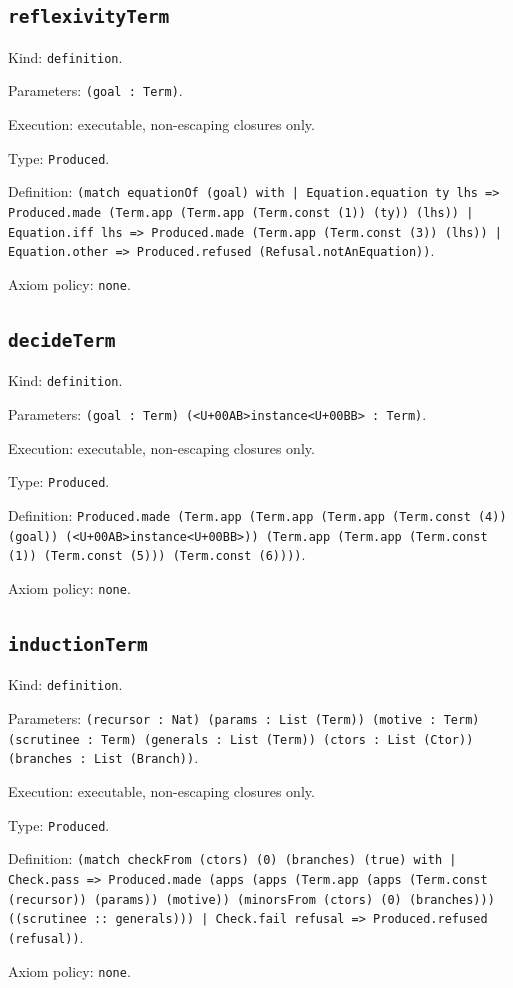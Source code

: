 \documentclass[11pt]{article}
\begin{document}
\subsection*{\texttt{reflexivityTerm}}
\noindent Kind: \texttt{definition}.\par
\noindent Parameters: \texttt{(goal : Term)}.\par
\noindent Execution: executable, non-escaping closures only.\par
\noindent Type: \texttt{Produced}.\par
\noindent Definition: \texttt{(match equationOf (goal) with | Equation.equation ty lhs => Produced.made (Term.app (Term.app (Term.const (1)) (ty)) (lhs)) | Equation.iff lhs => Produced.made (Term.app (Term.const (3)) (lhs)) | Equation.other => Produced.refused (Refusal.notAnEquation))}.\par
\noindent Axiom policy: \texttt{none}.\par
\subsection*{\texttt{decideTerm}}
\noindent Kind: \texttt{definition}.\par
\noindent Parameters: \texttt{(goal : Term) (<U+00AB>instance<U+00BB> : Term)}.\par
\noindent Execution: executable, non-escaping closures only.\par
\noindent Type: \texttt{Produced}.\par
\noindent Definition: \texttt{Produced.made (Term.app (Term.app (Term.app (Term.const (4)) (goal)) (<U+00AB>instance<U+00BB>)) (Term.app (Term.app (Term.const (1)) (Term.const (5))) (Term.const (6))))}.\par
\noindent Axiom policy: \texttt{none}.\par
\subsection*{\texttt{inductionTerm}}
\noindent Kind: \texttt{definition}.\par
\noindent Parameters: \texttt{(recursor : Nat) (params : List (Term)) (motive : Term) (scrutinee : Term) (generals : List (Term)) (ctors : List (Ctor)) (branches : List (Branch))}.\par
\noindent Execution: executable, non-escaping closures only.\par
\noindent Type: \texttt{Produced}.\par
\noindent Definition: \texttt{(match checkFrom (ctors) (0) (branches) (true) with | Check.pass => Produced.made (apps (apps (Term.app (apps (Term.const (recursor)) (params)) (motive)) (minorsFrom (ctors) (0) (branches))) ((scrutinee :: generals))) | Check.fail refusal => Produced.refused (refusal))}.\par
\noindent Axiom policy: \texttt{none}.\par
\end{document}
